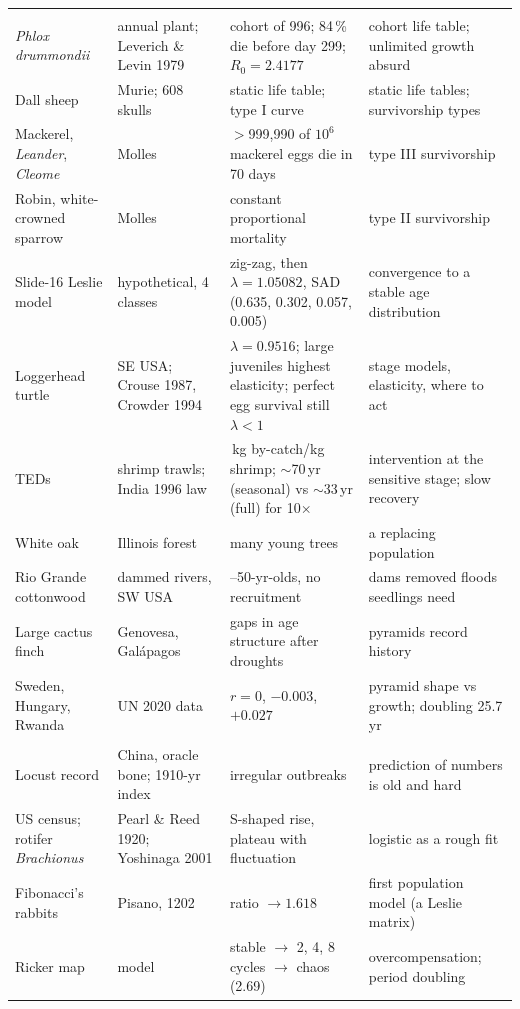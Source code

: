 {\begin{longtable}{>{\raggedright\arraybackslash}p{}>{\raggedright\arraybackslash}p{}>{\raggedright\arraybackslash}p{}>{\raggedright\arraybackslash}p{}}
\midrule
\multicolumn{4}{l}{\textbf{EE02 Structured populations}}\\
\emph{Phlox drummondii} & annual plant; Leverich \& Levin 1979 & cohort of 996; 84\,\% die before day 299; $R_0=2.4177$ & cohort life table; unlimited growth absurd\\
Dall sheep & Murie; 608 skulls & static life table; type I curve & static life tables; survivorship types\\
Mackerel, \emph{Leander}, \emph{Cleome} & Molles & $>$999{,}990 of $10^6$ mackerel eggs die in 70 days & type III survivorship\\
Robin, white-crowned sparrow & Molles & constant proportional mortality & type II survivorship\\
Slide-16 Leslie model & hypothetical, 4 classes & zig-zag, then $\lambda=1.05082$, SAD (0.635, 0.302, 0.057, 0.005) & convergence to a stable age distribution\\
Loggerhead turtle & SE USA; Crouse 1987, Crowder 1994 & $\lambda=0.9516$; large juveniles highest elasticity; perfect egg survival still $\lambda<1$ & stage models, elasticity, where to act\\
TEDs & shrimp trawls; India 1996 law & 5.7\,kg by-catch/kg shrimp; $\sim$70\,yr (seasonal) vs $\sim$33\,yr (full) for 10$\times$ & intervention at the sensitive stage; slow recovery\\
White oak & Illinois forest & many young trees & a replacing population\\
Rio Grande cottonwood & dammed rivers, SW USA & 40--50-yr-olds, no recruitment & dams removed floods seedlings need\\
Large cactus finch & Genovesa, Galápagos & gaps in age structure after droughts & pyramids record history\\
Sweden, Hungary, Rwanda & UN 2020 data & $r=0$, $-0.003$, $+0.027$ & pyramid shape vs growth; doubling 25.7\,yr\\
\midrule
\multicolumn{4}{l}{\textbf{EE03 Dynamics and chaos}}\\
Locust record & China, oracle bone; 1910-yr index & irregular outbreaks & prediction of numbers is old and hard\\
US census; rotifer \emph{Brachionus} & Pearl \& Reed 1920; Yoshinaga 2001 & S-shaped rise, plateau with fluctuation & logistic as a rough fit\\
Fibonacci's rabbits & Pisano, 1202 & ratio $\to1.618$ & first population model (a Leslie matrix)\\
Ricker map & model & stable $\to$ 2, 4, 8 cycles $\to$ chaos (2.69) & overcompensation; period doubling\\

\end{longtable}}
